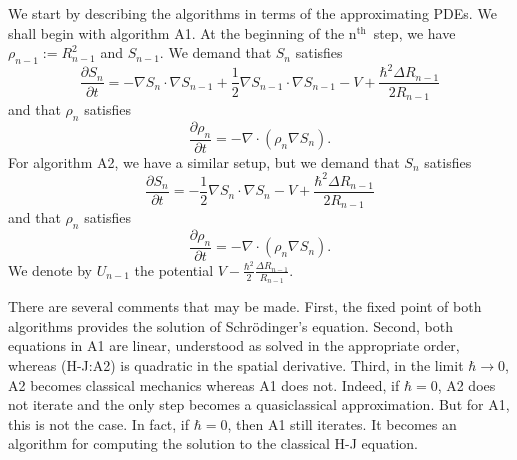 \documentclass[11pt]{article}
\theoremstyle{remark}
\begin{document}
We start by describing the algorithms in terms of the approximating
PDEs.
We
shall begin with algorithm A1. At the beginning
of the \ensuremath{\text{n}^{\text{th}}}\ step, we have 
$\ensuremath{\rho}_{n-1} \ensuremath{:=} R_{n-1}^2$ and $S_{n-1}$. We demand that $S_n$ satisfies
\[ \ensuremath{\frac{\partial {S_n}}{\partial {t}}} =  -\nabla S_n \cdot \nabla S_{n-1} +
\frac{1}{2} \nabla S_{n-1} \cdot \nabla S_{n-1} - V  +
\frac{\ensuremath{\hbar}^2 \ensuremath{\Delta} R_{n-1}}{2 R_{n-1}} \tag{H-J:A1, $n$}
\]
and that $\ensuremath{\rho}_{n}$ satisfies 
\[
\ensuremath{\frac{\partial {\ensuremath{\rho}_n}}{\partial {t}}} = - \nabla \cdot (\ensuremath{\rho}_n \nabla S_{n}) \tag{C:A1, $n$}.
\]
For algorithm A2, we have a similar setup, but we demand that $S_n$
satisfies 
\[
 \ensuremath{\frac{\partial {S_n}}{\partial {t}}} = -\frac{1}{2} \nabla S_{n} \cdot \nabla S_{n} - V  +
\frac{\ensuremath{\hbar}^2 \ensuremath{\Delta} R_{n-1}}{2 R_{n-1}} \tag{H-J:A2, $n$}
\]
and that $\ensuremath{\rho}_{n}$ satisfies 
\[
\ensuremath{\frac{\partial {\ensuremath{\rho}_n}}{\partial {t}}} = - \nabla \cdot (\ensuremath{\rho}_n \nabla S_{n}) \tag{C:A2, $n$}.
\]
We denote by $U_{n-1}$  the potential $V  - \frac{\ensuremath{\hbar}^2}{2}\frac{\ensuremath{\Delta}
R_{n-1}}{ R_{n-1}}$. 

There are several comments that may be made. First, the fixed point of
both algorithms provides the solution of Schr\"odinger's equation. Second, both equations in
A1 are linear, understood as solved in the appropriate order, 
 whereas  (H-J:A2) is quadratic in the spatial
derivative. Third, in the limit 
$\ensuremath{\hbar} \to 0$, A2 becomes classical mechanics whereas A1 does
not. Indeed, if $\ensuremath{\hbar} =0$, A2 does not iterate and the only step becomes a
quasiclassical approximation. But for A1, this is not the case. In
fact, if $\ensuremath{\hbar} =0$, then A1 still iterates. It becomes an algorithm for
computing the solution to the classical H-J equation. 
\end{document}
